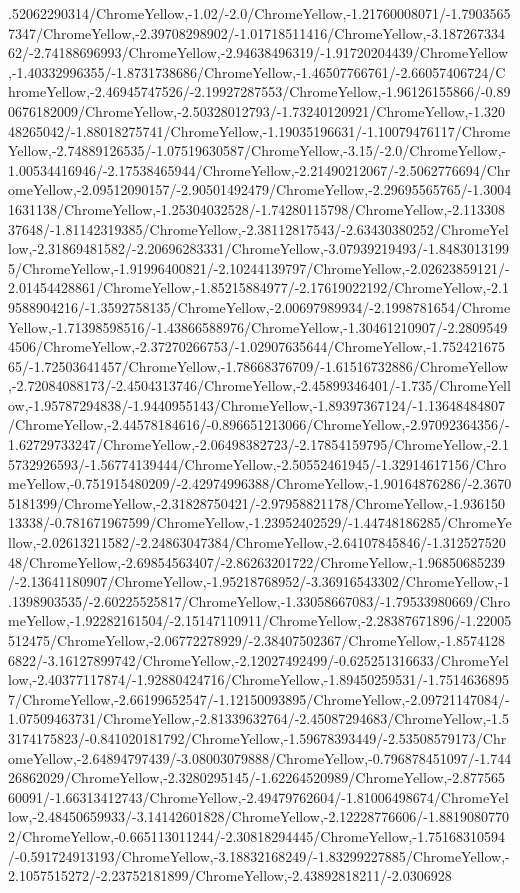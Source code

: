 {\begin{tikzternal}
.52062290314/ChromeYellow,-1.02/-2.0/ChromeYellow,-1.21760008071/-1.79035657347/ChromeYellow,-2.39708298902/-1.01718511416/ChromeYellow,-3.18726733462/-2.74188696993/ChromeYellow,-2.94638496319/-1.91720204439/ChromeYellow,-1.40332996355/-1.8731738686/ChromeYellow,-1.46507766761/-2.66057406724/ChromeYellow,-2.46945747526/-2.19927287553/ChromeYellow,-1.96126155866/-0.890676182009/ChromeYellow,-2.50328012793/-1.73240120921/ChromeYellow,-1.32048265042/-1.88018275741/ChromeYellow,-1.19035196631/-1.10079476117/ChromeYellow,-2.74889126535/-1.07519630587/ChromeYellow,-3.15/-2.0/ChromeYellow,-1.00534416946/-2.17538465944/ChromeYellow,-2.21490212067/-2.5062776694/ChromeYellow,-2.09512090157/-2.90501492479/ChromeYellow,-2.29695565765/-1.30041631138/ChromeYellow,-1.25304032528/-1.74280115798/ChromeYellow,-2.11330837648/-1.81142319385/ChromeYellow,-2.38112817543/-2.63430380252/ChromeYellow,-2.31869481582/-2.20696283331/ChromeYellow,-3.07939219493/-1.84830131995/ChromeYellow,-1.91996400821/-2.10244139797/ChromeYellow,-2.02623859121/-2.01454428861/ChromeYellow,-1.85215884977/-2.17619022192/ChromeYellow,-2.19588904216/-1.3592758135/ChromeYellow,-2.00697989934/-2.1998781654/ChromeYellow,-1.71398598516/-1.43866588976/ChromeYellow,-1.30461210907/-2.28095494506/ChromeYellow,-2.37270266753/-1.02907635644/ChromeYellow,-1.75242167565/-1.72503641457/ChromeYellow,-1.78668376709/-1.61516732886/ChromeYellow,-2.72084088173/-2.4504313746/ChromeYellow,-2.45899346401/-1.735/ChromeYellow,-1.95787294838/-1.9440955143/ChromeYellow,-1.89397367124/-1.13648484807/ChromeYellow,-2.44578184616/-0.896651213066/ChromeYellow,-2.97092364356/-1.62729733247/ChromeYellow,-2.06498382723/-2.17854159795/ChromeYellow,-2.15732926593/-1.56774139444/ChromeYellow,-2.50552461945/-1.32914617156/ChromeYellow,-0.751915480209/-2.42974996388/ChromeYellow,-1.90164876286/-2.36705181399/ChromeYellow,-2.31828750421/-2.97958821178/ChromeYellow,-1.93615013338/-0.781671967599/ChromeYellow,-1.23952402529/-1.44748186285/ChromeYellow,-2.02613211582/-2.24863047384/ChromeYellow,-2.64107845846/-1.31252752048/ChromeYellow,-2.69854563407/-2.86263201722/ChromeYellow,-1.96850685239/-2.13641180907/ChromeYellow,-1.95218768952/-3.36916543302/ChromeYellow,-1.1398903535/-2.60225525817/ChromeYellow,-1.33058667083/-1.79533980669/ChromeYellow,-1.92282161504/-2.15147110911/ChromeYellow,-2.28387671896/-1.22005512475/ChromeYellow,-2.06772278929/-2.38407502367/ChromeYellow,-1.85741286822/-3.16127899742/ChromeYellow,-2.12027492499/-0.625251316633/ChromeYellow,-2.40377117874/-1.92880424716/ChromeYellow,-1.89450259531/-1.75146368957/ChromeYellow,-2.66199652547/-1.12150093895/ChromeYellow,-2.09721147084/-1.07509463731/ChromeYellow,-2.81339632764/-2.45087294683/ChromeYellow,-1.53174175823/-0.841020181792/ChromeYellow,-1.59678393449/-2.53508579173/ChromeYellow,-2.64894797439/-3.08003079888/ChromeYellow,-0.796878451097/-1.74426862029/ChromeYellow,-2.3280295145/-1.62264520989/ChromeYellow,-2.87756560091/-1.66313412743/ChromeYellow,-2.49479762604/-1.81006498674/ChromeYellow,-2.48450659933/-3.14142601828/ChromeYellow,-2.12228776606/-1.88190807702/ChromeYellow,-0.665113011244/-2.30818294445/ChromeYellow,-1.75168310594/-0.591724913193/ChromeYellow,-3.18832168249/-1.83299227885/ChromeYellow,-2.1057515272/-2.23752181899/ChromeYellow,-2.43892818211/-2.0306928
\end{tikzternal}}
